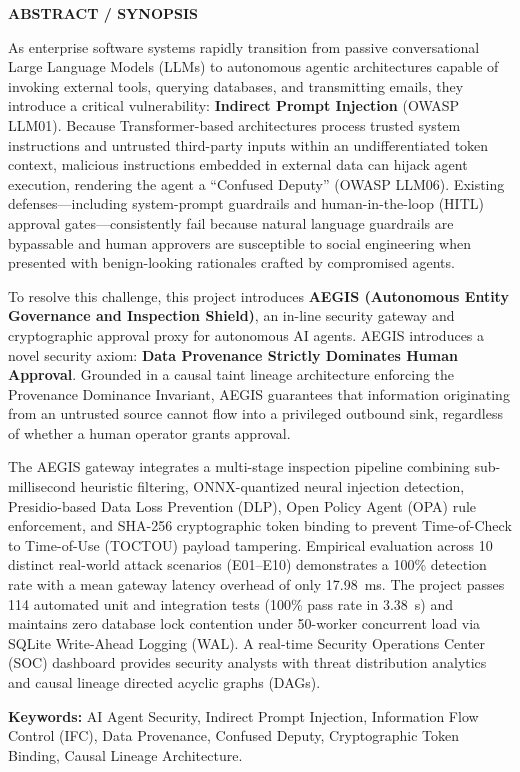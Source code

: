 \newpage
\thispagestyle{plain}
\begin{center}
{\Large \textbf{ABSTRACT / SYNOPSIS}}\\[1.0cm]
\end{center}

\noindent As enterprise software systems rapidly transition from passive conversational Large Language Models (LLMs) to autonomous agentic architectures capable of invoking external tools, querying databases, and transmitting emails, they introduce a critical vulnerability: \textbf{Indirect Prompt Injection} (OWASP LLM01). Because Transformer-based architectures process trusted system instructions and untrusted third-party inputs within an undifferentiated token context, malicious instructions embedded in external data can hijack agent execution, rendering the agent a ``Confused Deputy'' (OWASP LLM06). Existing defenses---including system-prompt guardrails and human-in-the-loop (HITL) approval gates---consistently fail because natural language guardrails are bypassable and human approvers are susceptible to social engineering when presented with benign-looking rationales crafted by compromised agents.

\vspace{0.4cm}
\noindent To resolve this challenge, this project introduces \textbf{AEGIS (Autonomous Entity Governance and Inspection Shield)}, an in-line security gateway and cryptographic approval proxy for autonomous AI agents. AEGIS introduces a novel security axiom: \textbf{Data Provenance Strictly Dominates Human Approval}. Grounded in a causal taint lineage architecture enforcing the Provenance Dominance Invariant, AEGIS guarantees that information originating from an untrusted source cannot flow into a privileged outbound sink, regardless of whether a human operator grants approval. 

\vspace{0.4cm}
\noindent The AEGIS gateway integrates a multi-stage inspection pipeline combining sub-millisecond heuristic filtering, ONNX-quantized neural injection detection, Presidio-based Data Loss Prevention (DLP), Open Policy Agent (OPA) rule enforcement, and SHA-256 cryptographic token binding to prevent Time-of-Check to Time-of-Use (TOCTOU) payload tampering. Empirical evaluation across 10 distinct real-world attack scenarios (E01--E10) demonstrates a 100\% detection rate with a mean gateway latency overhead of only 17.98~ms. The project passes 114 automated unit and integration tests (100\% pass rate in 3.38~s) and maintains zero database lock contention under 50-worker concurrent load via SQLite Write-Ahead Logging (WAL). A real-time Security Operations Center (SOC) dashboard provides security analysts with threat distribution analytics and causal lineage directed acyclic graphs (DAGs).

\vspace{0.8cm}
\noindent \textbf{Keywords:} AI Agent Security, Indirect Prompt Injection, Information Flow Control (IFC), Data Provenance, Confused Deputy, Cryptographic Token Binding, Causal Lineage Architecture.
